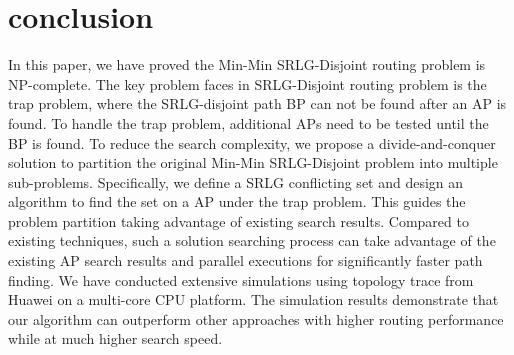 \documentclass[10pt,journal,letterpaper]{IEEEtran}
\begin{document}
\section{conclusion}
\label{sec:conclusion}
In this paper, we have proved the Min-Min  SRLG-Disjoint routing problem is NP-complete. The key problem faces in SRLG-Disjoint routing problem  is the trap problem, where the SRLG-disjoint path BP can not be found after an AP is found. To handle the trap problem, additional APs need to be tested until the BP is found. To reduce the search complexity, we propose a divide-and-conquer solution to partition the original Min-Min SRLG-Disjoint problem into multiple sub-problems. Specifically, we define a SRLG conflicting set and design an algorithm to find the set on a AP under the trap problem. This guides the problem partition taking advantage of existing search results. Compared to existing techniques, such a solution searching process can take advantage of the existing AP search results and parallel executions for significantly faster path finding.
We have conducted extensive simulations  using  topology trace from Huawei on a multi-core CPU platform. The simulation results demonstrate that our algorithm can outperform other approaches with higher routing performance while at much higher search
speed.




\end{document}

